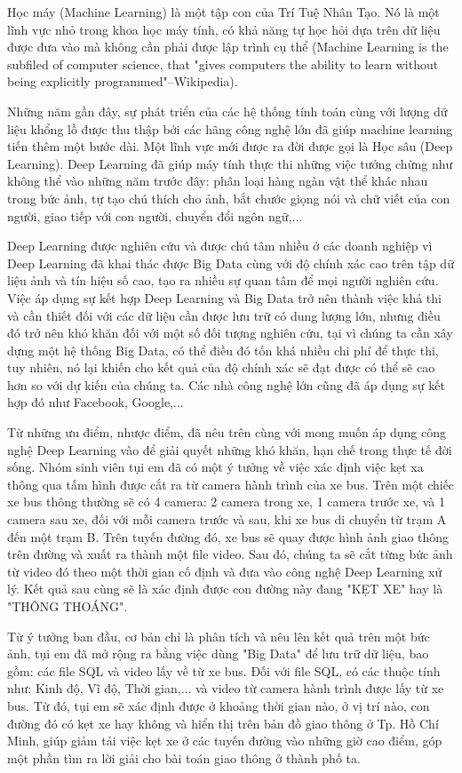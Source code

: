Học máy (Machine Learning) là một tập con của Trí Tuệ Nhân Tạo. Nó là một lĩnh vực nhỏ trong khoa học máy tính, có khả năng tự học hỏi dựa trên dữ liệu được đưa vào mà không cần phải được lập trình cụ thể (Machine Learning is the subfiled of computer science, that "gives computers the ability to learn without being explicitly programmed"–Wikipedia).\par
Những năm gần đây, sự phát triển của các hệ thống tính toán cùng với lượng dữ liệu khổng lồ được thu thập bởi các hãng công nghệ lớn đã giúp machine learning tiến thêm một bước dài. Một lĩnh vực mới được ra đời được gọi là Học sâu (Deep Learning). Deep Learning đã giúp máy tính thực thi những việc tưởng chừng như không thể vào những năm trước đây: phân loại hàng ngàn vật thể khác nhau trong bức ảnh, tự tạo chú thích cho ảnh, bắt chước giọng nói và chữ viết của con người, giao tiếp với con người, chuyển đổi ngôn ngữ,...\par
Deep Learning được nghiên cứu và được chú tâm nhiều ở các doanh nghiệp vì Deep Learning đã khai thác được Big Data cùng với độ chính xác cao trên tập dữ liệu ảnh và tín hiệu số cao, tạo ra nhiều sự quan tâm để mọi người nghiên cứu. Việc áp dụng sự kết hợp Deep Learning và Big Data trở nên thành việc khả thi và cần thiết đối với các dữ liệu cần được lưu trữ có dung lượng lớn, nhưng điều đó trở nên khó khăn đối với một số đối tượng nghiên cứu, tại vì chúng ta cần xây dựng một hệ thống Big Data, có thể điều đó tốn khá nhiều chi phí để thực thi, tuy nhiên, nó lại khiến cho kết quả của độ chính xác sẽ đạt được có thể sẽ cao hơn so với dự kiến của chúng ta. Các nhà công nghệ lớn cũng đã áp dụng sự kết hợp đó như Facebook, Google,...\par
Từ những ưu điểm, nhược điểm, đã nêu trên cùng với mong muốn áp dụng công nghệ Deep Learning vào để giải quyết những khó khăn, hạn chế trong thực tế đời sống. Nhóm sinh viên tụi em đã có một ý tưởng về việc xác định việc kẹt xa thông qua tấm hình được cắt ra từ camera hành trình của xe bus. Trên một chiếc xe bus thông thường sẽ có 4 camera: 2 camera trong xe, 1 camera trước xe, và 1 camera sau xe, đối với mỗi camera trước và sau, khi xe bus di chuyển từ trạm A đến một trạm B. Trên tuyến đường đó, xe bus sẽ quay được hình ảnh giao thông trên đường và xuất ra thành một file video. Sau đó, chúng ta sẽ cắt từng bức ảnh từ video đó theo một thời gian cố định và đưa vào công nghệ Deep Learning xử lý. Kết quả sau cùng sẽ là xác định được con đường này đang "KẸT XE" hay là "THÔNG THOÁNG".\par
Từ ý tưởng ban đầu, cơ bản chỉ là phân tích và nêu lên kết quả trên một bức ảnh, tụi em đã mở rộng ra bằng việc dùng "Big Data" để lưu trữ dữ liệu, bao gồm: các file SQL và video lấy về từ xe bus. Đối với file SQL, có các thuộc tính như: Kinh độ, Vĩ độ, Thời gian,... và video từ camera hành trình được lấy từ xe bus. Từ đó, tụi em sẽ xác định được ở khoảng thời gian nào, ở vị trí nào, con đường đó có kẹt xe hay không và hiển thị trên bản đồ giao thông ở Tp. Hồ Chí Minh, giúp giảm tải việc kẹt xe ở các tuyến đường vào những giờ cao điểm, góp một phần tìm ra lời giải cho bài toán giao thông ở thành phố ta.\par
